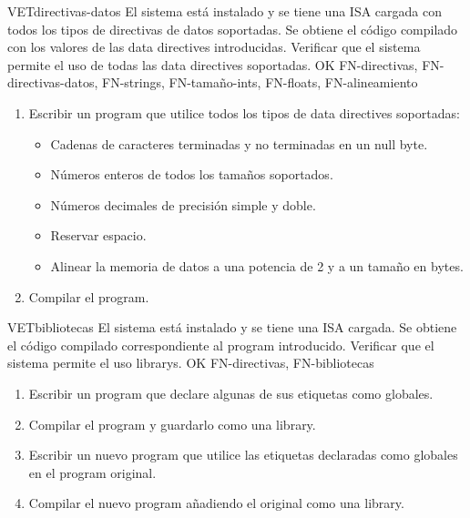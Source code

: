 \begin{testCase}{VET}{directivas-datos}
    {El sistema está instalado y se tiene una \gls{ISA} cargada con todos los
    tipos de directivas de datos soportadas.} %
    {Se obtiene el código compilado con los valores de las \glspl{data directive} introducidas.} %
    {Verificar que el sistema permite el uso de todas las \glspl{data directive} soportadas.} %
    {OK} %
    {FN-directivas, FN-directivas-datos, FN-strings, FN-tamaño-ints, FN-floats, FN-alineamiento} %
    \begin{enumerate}[leftmargin=*, topsep=0pt, noitemsep] %
        \item Escribir un \gls{program} que utilice todos los tipos de
        \glspl{data directive} soportadas:
        \begin{itemize}
            \item Cadenas de caracteres terminadas y no terminadas en un
            \gls{null byte}.
            \item Números enteros de todos los tamaños soportados.
            \item Números decimales de precisión simple y doble.
            \item Reservar espacio.
            \item Alinear la memoria de datos a una potencia de 2 y a un tamaño en bytes.
        \end{itemize}
        \item Compilar el \gls{program}.
    \end{enumerate}
\end{testCase}

\begin{testCase}{VET}{bibliotecas}
    {El sistema está instalado y se tiene una \gls{ISA} cargada.} %
    {Se obtiene el código compilado correspondiente al \gls{program} introducido.} %
    {Verificar que el sistema permite el uso \glspl{library}.} %
    {OK} %
    {FN-directivas, FN-bibliotecas} %
    \begin{enumerate}[leftmargin=*, topsep=0pt, noitemsep] %
        \item Escribir un \gls{program} que declare algunas de sus etiquetas
        como globales.
        \item Compilar el \gls{program} y guardarlo como una \gls{library}.
        \item Escribir un nuevo \gls{program} que utilice las etiquetas
        declaradas como globales en el \gls{program} original.
        \item Compilar el nuevo \gls{program} añadiendo el original como una
        \gls{library}.
    \end{enumerate}
\end{testCase}

